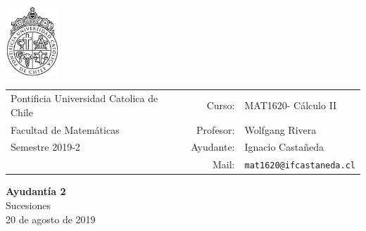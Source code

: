 \documentclass[12pt]{article}
\makeatletter
\newcommand{\ayudantia}{{\sc Ayudantía 2}}
\newcommand{\tituloayu}{Sucesiones}
\newcommand{\fecha}{20 de agosto de 2019}
\newcommand{\sigla}{MAT1620}
\newcommand{\nombre}{Cálculo II}
\newcommand{\profesor}{Wolfgang Rivera}
\newcommand{\ano}{2019}
\newcommand{\semestre}{2}
\newcommand{\mail}{mat1620@ifcastaneda.cl}
\makeatother
\begin{document}
\thispagestyle{empty}

\begin{minipage}{2cm}
	\includegraphics[width=2cm]{../../../../img/logo.pdf}
	\vspace{0.5cm}
\end{minipage}
\begin{minipage}{\linewidth}
	\begin{tabular}{lrl}
		{\scriptsize\sc Pontificia Universidad Catolica de Chile} & \hspace*{0.7in}Curso: &
		\sigla  - \nombre\\
		{\sc Facultad de Matemáticas}&
		Profesor: & \profesor \\
		{\sc Semestre \ano-\semestre} & Ayudante: & {Ignacio Castañeda}\\
		& {Mail:} & \texttt{\mail}
	\end{tabular}
\end{minipage}

\vspace{-10mm}
\begin{center}
	{\LARGE\bf \ayudantia}\\
	\vspace{0.1cm}
	{\tituloayu}\\
	\vspace{0.1cm}
	\fecha\\
	\vspace{0.4cm}
\end{center}
\end{document}
